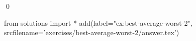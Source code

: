 
\begin{ex} 
  \label{ex:best-average-worst-2}
  
  \qed
\end{ex} 
\begin{python0}
from solutions import *
add(label="ex:best-average-worst-2",
    srcfilename='exercises/best-average-worst-2/answer.tex') 
\end{python0}
